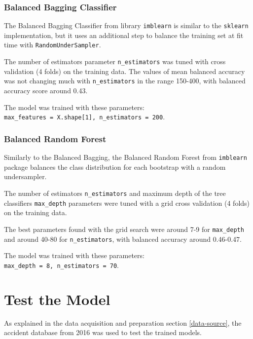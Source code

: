 \documentclass[11pt]{article}
\begin{document}
    \hypertarget{balanced-bagging-classifier}{%
\subsubsection{Balanced Bagging Classifier}\label{balanced-bagging-classifier}}

The Balanced Bagging Classifier from library \texttt{imblearn} is similar to the \texttt{sklearn} implementation, but it uses an additional step to balance the training set at fit time with \texttt{RandomUnderSampler}.

The number of estimators parameter \texttt{n\_estimators} was tuned with cross validation (4 folds) on the training data. The values of mean balanced accuracy was not changing much with \texttt{n\_estimators} in the range 150-400, with balanced accuracy score around 0.43.

The model was trained with these parameters:\\
\texttt{max\_features = X.shape[1], n\_estimators = 200}.
        
    \hypertarget{balanced-random-forest}{%
\subsubsection{Balanced Random Forest}\label{balanced-random-forest}}

Similarly to the Balanced Bagging, the Balanced Random Forest from \texttt{imblearn} package balances the class distribution for each bootstrap with a random undersampler.

The number of estimators \texttt{n\_estimators} and maximum depth of the tree classifiers \texttt{max\_depth} parameters were tuned with a grid cross validation (4 folds) on the training data.

The best parameters found with the grid search were around 7-9 for \texttt{max\_depth} and around 40-80 for \texttt{n\_estimators}, with balanced accuracy around 0.46-0.47.

The model was trained with these parameters:\\
\texttt{max\_depth = 8, n\_estimators = 70}.

    \hypertarget{test-the-model}{%
\section{Test the Model}\label{test-the-model}}

As explained in the data acquisition and preparation section \ref{data-source}, the accident database from 2016 was used to test the trained models.
\end{document}
